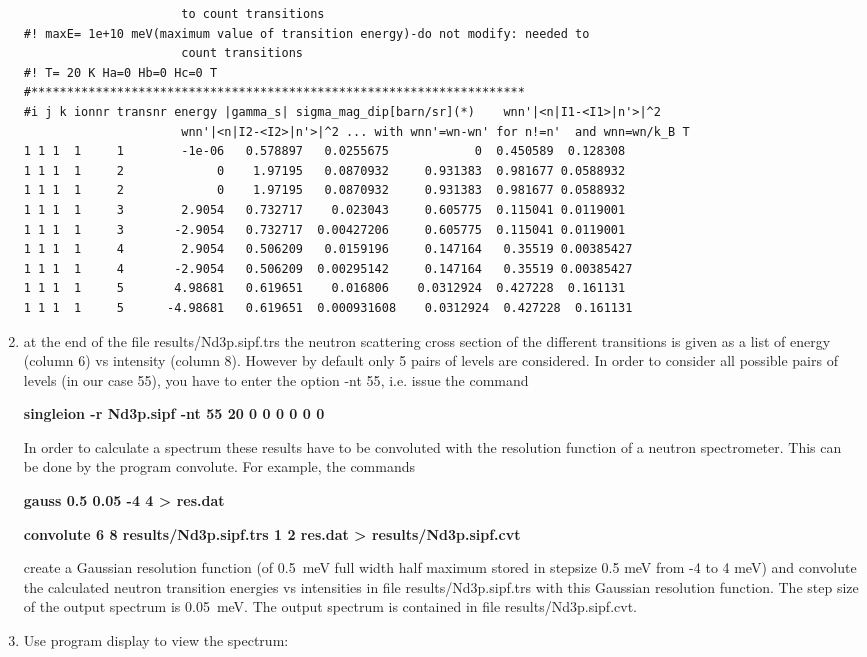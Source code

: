 \begin{enumerate}
{\begin{verbatim}
                      to count transitions
#! maxE= 1e+10 meV(maximum value of transition energy)-do not modify: needed to 
                      count transitions
#! T= 20 K Ha=0 Hb=0 Hc=0 T
#*********************************************************************
#i j k ionnr transnr energy |gamma_s| sigma_mag_dip[barn/sr](*)    wnn'|<n|I1-<I1>|n'>|^2 
                      wnn'|<n|I2-<I2>|n'>|^2 ... with wnn'=wn-wn' for n!=n'  and wnn=wn/k_B T 
1 1 1  1     1        -1e-06   0.578897   0.0255675            0  0.450589  0.128308
1 1 1  1     2             0    1.97195   0.0870932     0.931383  0.981677 0.0588932
1 1 1  1     2             0    1.97195   0.0870932     0.931383  0.981677 0.0588932
1 1 1  1     3        2.9054   0.732717    0.023043     0.605775  0.115041 0.0119001
1 1 1  1     3       -2.9054   0.732717  0.00427206     0.605775  0.115041 0.0119001
1 1 1  1     4        2.9054   0.506209   0.0159196     0.147164   0.35519 0.00385427
1 1 1  1     4       -2.9054   0.506209  0.00295142     0.147164   0.35519 0.00385427
1 1 1  1     5       4.98681   0.619651    0.016806    0.0312924  0.427228  0.161131
1 1 1  1     5      -4.98681   0.619651  0.000931608    0.0312924  0.427228  0.161131
\end{verbatim}
}
\item at the end of the file {\prg results/Nd3p.sipf.trs} the neutron scattering cross 
section of the different 
transitions is given as a list of energy (column 6) vs intensity (column 8).
However by default only 5 pairs of levels are considered. In order to consider all
possible pairs of levels (in our case 55), you have to enter the option {\prg  -nt 55}, i.e.
issue the command

{\bf singleion -r Nd3p.sipf -nt 55  20 0 0 0  0 0 0} 

In order to calculate a spectrum these results
have to be convoluted with the resolution function of a neutron spectrometer. This can be 
done by the program {\prg convolute}. For example, the commands
 
 {\bf gauss 0.5 0.05 -4 4 > res.dat}

 {\bf convolute 6 8 results/Nd3p.sipf.trs 1 2 res.dat > results/Nd3p.sipf.cvt} 

create a Gaussian resolution function (of 0.5~meV full width half maximum stored in
stepsize 0.5 meV from -4 to 4 meV) and convolute the calculated neutron 
transition energies vs intensities in file {\prg results/Nd3p.sipf.trs}
with this Gaussian resolution function. The step size of the
output spectrum is 0.05~meV. The output spectrum is contained in file {\prg results/Nd3p.sipf.cvt}.
\item 
Use program  {\prg display}
 to view the spectrum: 


\end{enumerate}
